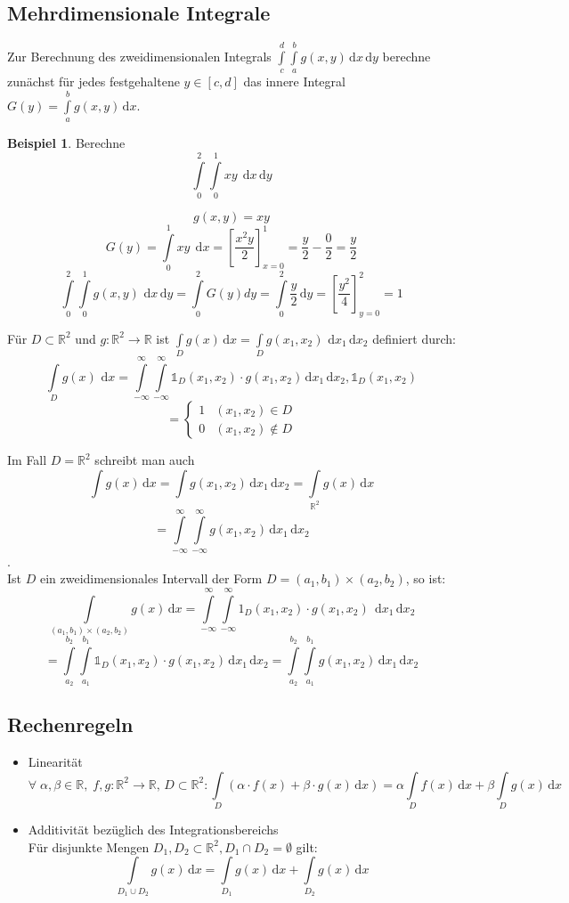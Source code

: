 \documentclass[12pt, a4paper]{article}
\theoremstyle{plain}
\theoremstyle{definition}
\newtheorem{beispiel}[thm]{Beispiel}
\newcommand{\1}{\mathds{1}}
\renewcommand{\d}{\,\mathrm{d}}
\begin{document}
\subsection{Mehrdimensionale Integrale}
Zur Berechnung des zweidimensionalen Integrals \(\int\limits_c^d\int\limits_a^b g(x,y)\d x\d y\) berechne zunächst für jedes festgehaltene \(y\in[c,d]\) das innere Integral \(G(y)=\int\limits_a^b g(x,y)\d x\).

   \begin{beispiel}
   Berechne \[\int\limits_0^2\int\limits_0^1 xy \; \d x\d y\]
      \end{beispiel}
   \[g(x,y)=xy\]
   \[G(y)=\int\limits_0^1 xy \; \d x=\left[\frac{x^2y}{2}\right]_{x=0}^1=\frac{y}{2}-\frac{0}{2}=\frac{y}{2}\]
   \[\int\limits_0^2\int\limits_0^1 g(x,y)\, \d x\d y=\int\limits_0^2 G(y)dy=\int\limits_0^2 \frac{y}{2}\d y=\left[\frac{y^2}{4}\right]_{y=0}^2=1\]

Für \(D\subset\mathbb{R}^2\) und \(g:\mathbb{R}^2\to\mathbb{R}\) ist \(\int\limits_D g(x)\d x=\int\limits_D g(x_1,x_2)\,\d x_1 \d x_2\) definiert durch:
\[\int\limits_D g(x)\, \d x=\int\limits_{-\infty}^{\infty}\int\limits_{-\infty}^{\infty} \1_D(x_1,x_2)\cdot g(x_1,x_2)\d x_1 \d x_2 , \1_D(x_1,x_2) \]
\[=\begin{cases}1&(x_1,x_2)\in D\\0&(x_1,x_2)\notin D\end{cases}\]

Im Fall \(D=\mathbb{R}^2\) schreibt man auch \[\int\limits g(x)\d x=\int\limits g(x_1,x_2)\d x_1 \d x_2=\int\limits_{\mathbb{R}^2} g(x)\d x\]
\[=\int\limits_{-\infty}^{\infty}\int\limits_{-\infty}^{\infty} g(x_1,x_2)\d x_1 \d x_2\].\\

Ist \(D\) ein zweidimensionales Intervall der Form \(D=(a_1,b_1)\times(a_2,b_2)\), so ist:
\[\int\limits_{(a_1,b_1)\times(a_2,b_2)}g(x)\d x=\int\limits_{-\infty}^{\infty}\int\limits_{-\infty}^{\infty} 1_D(x_1,x_2)\cdot g(x_1,x_2)\;\d x_1 \d x_2\]
\[=\int\limits_{a_2}^{b_2}\int\limits_{a_1}^{b_1} \1_D(x_1,x_2)\cdot g(x_1,x_2) \d x_1 \d x_2 = \int\limits_{a_2}^{b_2} \int\limits_{a_1}^{b_1} g(x_1,x_2) \d x_1 \d x_2 \]

   \subsection{Rechenregeln}
   \begin{itemize}
   
   \item
   Linearität
   \[\forall \; \alpha,\beta\in\mathbb{R},\;f,g:\mathbb{R}^2\to\mathbb{R},\,D\subset\mathbb{R}^2: \int\limits_D (\alpha\cdot f(x)+\beta\cdot g(x)\d x)=\alpha\int\limits_D f(x)\d x+\beta\int\limits_D g(x)\d x\]
   
   \item
   Additivität bezüglich des Integrationsbereichs\\
   Für disjunkte Mengen \(D_1 , D_2\subset\mathbb{R}^2, D_1 \cap D_2 =\emptyset\) gilt:
   \[\int\limits_{D_1 \cup D_2} g(x) \d x = \int\limits_{D_1} g(x)\d x + \int\limits_{D_2} g(x)\d x\]
   
   \end{itemize}
\end{document}
